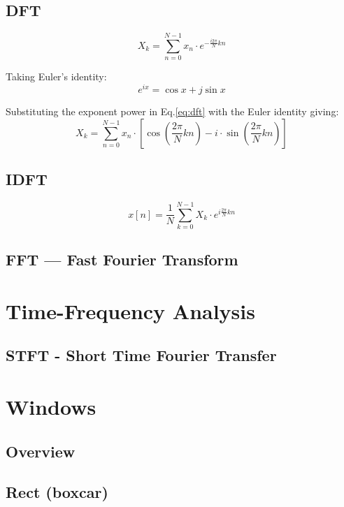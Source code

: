 \subsection{DFT}
\begin{equation}
    \label{eq:dft}
    X_k = \sum_{n=0}^{N-1} x_n \cdot e^{-\frac {i 2\pi}{N}kn}
\end{equation}

Taking Euler's identity:
\begin{equation}
    e^{ix} = \cos x + j\sin x
\end{equation}

Substituting the exponent power in Eq.\ref{eq:dft} with the Euler identity
giving:
\begin{equation}
    X_k = \sum_{n=0}^{N-1} x_n \cdot \left[\cos\left(\frac{2 \pi}{N}kn\right)
        - i \cdot \sin\left(\frac{2 \pi}{N}kn\right)\right]
\end{equation}


\subsection{IDFT}
\begin{equation}
    x[n] = \frac{1}{N} \sum_{k=0}^{N-1} X_k\cdot e^{i \frac{2 \pi}{N} k n}
\end{equation}


\subsection{FFT --- Fast Fourier Transform}

\section{Time-Frequency Analysis}
\subsection{STFT - Short Time Fourier Transfer}

\section{Windows}
\subsection{Overview}


\subsection{Rect (boxcar)}
